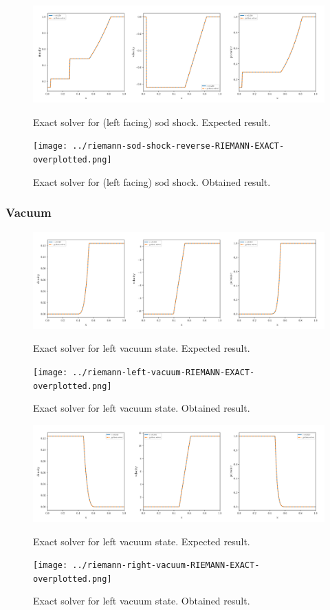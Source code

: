\begin{figure}[htbp]
    \centering
	\includegraphics[width=.9\textwidth]{./figures/riemann-sod-shock-reverse-RIEMANN-EXACT-overplotted.png}%
	\caption{Exact solver for (left facing) sod shock. Expected result.}
	\texttt{[image: ../riemann-sod-shock-reverse-RIEMANN-EXACT-overplotted.png]}%
	\caption{Exact solver for (left facing) sod shock. Obtained result.}
\end{figure}












\clearpage
\subsubsection{Vacuum}


\begin{figure}[htbp]
    \centering
	\includegraphics[width=.9\textwidth]{./figures/riemann-left-vacuum-RIEMANN-EXACT-overplotted.png}%
	\caption{Exact solver for left vacuum state. Expected result.}
	\texttt{[image: ../riemann-left-vacuum-RIEMANN-EXACT-overplotted.png]}
	\caption{Exact solver for left vacuum state. Obtained result.}
\end{figure}


\begin{figure}[htbp]
    \centering
	\includegraphics[width=.9\textwidth]{./figures/riemann-right-vacuum-RIEMANN-EXACT-overplotted.png}%
	\caption{Exact solver for left vacuum state. Expected result.}
	\texttt{[image: ../riemann-right-vacuum-RIEMANN-EXACT-overplotted.png]}
	\caption{Exact solver for left vacuum state. Obtained result.}
\end{figure}


